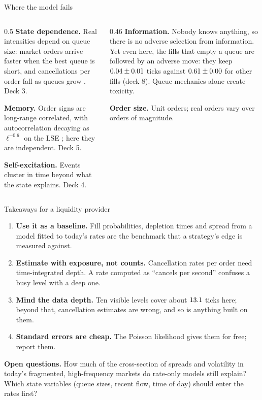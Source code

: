 \documentclass[aspectratio=169,10pt]{beamer}
\begin{document}
\begin{frame}{Where the model fails}
  \small
  \begin{columns}[T]
    \begin{column}{0.5\textwidth}
      \textbf{State dependence.} Real intensities depend on queue size: market orders arrive faster when the best queue is short, and cancellations per order fall as queues grow \citep{huang2015simulating}. Deck 3.

      \vspace{0.4em}
      \textbf{Memory.} Order signs are long-range correlated, with autocorrelation decaying as $\ell^{-0.6}$ on the LSE \citep{lillo2004long}; here they are independent. Deck 5.

      \vspace{0.4em}
      \textbf{Self-excitation.} Events cluster in time beyond what the state explains. Deck 4.
    \end{column}
    \begin{column}{0.46\textwidth}
      \textbf{Information.} Nobody knows anything, so there is no adverse selection from information. Yet even here, the fills that empty a queue are followed by an adverse move: they keep $0.04 \pm 0.01$ ticks against $0.61 \pm 0.00$ for other fills (deck 8). Queue mechanics alone create toxicity.

      \vspace{0.4em}
      \textbf{Order size.} Unit orders; real orders vary over orders of magnitude.
    \end{column}
  \end{columns}
\end{frame}

\begin{frame}{Takeaways for a liquidity provider}
  \small
  \begin{enumerate}
    \item \textbf{Use it as a baseline.} Fill probabilities, depletion times and spread from a model fitted to today's rates are the benchmark that a strategy's edge is measured against.
    \item \textbf{Estimate with exposure, not counts.} Cancellation rates per order need time-integrated depth. A rate computed as ``cancels per second'' confuses a busy level with a deep one.
    \item \textbf{Mind the data depth.} Ten visible levels cover about $13.1$ ticks here; beyond that, cancellation estimates are wrong, and so is anything built on them.
    \item \textbf{Standard errors are cheap.} The Poisson likelihood gives them for free; report them.
  \end{enumerate}
  \vspace{0.3em}
  \textbf{Open questions.} How much of the cross-section of spreads and volatility in today's fragmented, high-frequency markets do rate-only models still explain? Which state variables (queue sizes, recent flow, time of day) should enter the rates first?
\end{frame}
\end{document}

